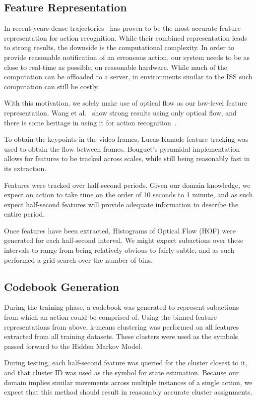 \documentclass[10pt,twocolumn,letterpaper]{article}
\begin{document}
\subsection{Feature Representation}
In recent years dense trajectories~\cite{wang2011action} has proven to be the most accurate feature representation for action recognition. While their combined representation leads to strong results, the downside is the computational complexity. In order to provide reasonable notification of an erroneous action, our system needs to be as close to real-time as possible, on reasonable hardware. While much of the computation can be offloaded to a server, in environments similar to the ISS such computation can still be costly.

With this motivation, we solely make use of optical flow as our low-level feature representation. Wang et al.~\cite{wang2011action} show strong results using only optical flow, and there is some heritage in using it for action recognition~\cite{chaudhry2009histograms}.

To obtain the keypoints in the video frames, Lucas-Kanade feature tracking was used to obtain the flow between frames. Bouguet's pyramidal implementation~\cite{bouguet2001pyramidal} allows for features to be tracked across scales, while still being reasonably fast in its extraction.

Features were tracked over half-second periods. Given our domain knowledge, we expect an action to take time on the order of 10 seconds to 1 minute, and as such expect half-second features will provide adequate information to describe the entire period.

Once features have been extracted, Histograms of Optical Flow (HOF) were generated for each half-second interval. We might expect subactions over these intervals to range from being relatively obvious to fairly subtle, and as such performed a grid search over the number of bins.

\subsection{Codebook Generation}
During the training phase, a codebook was generated to represent subactions from which an action could be comprised of. Using the binned feature representations from above, k-means clustering was performed on all features extracted from all training datasets. These clusters were used as the symbols passed forward to the Hidden Markov Model.

During testing, each half-second feature was queried for the cluster closest to it, and that cluster ID was used as the symbol for state estimation. Because our domain implies similar movements across multiple instances of a single action, we expect that this method should result in reasonably accurate cluster assignments.
\end{document}
